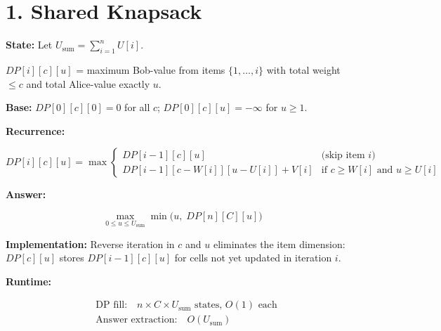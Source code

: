 \documentclass[11pt]{article}
\begin{document}
\section*{1. Shared Knapsack}

\textbf{State:}
Let $U_{\mathrm{sum}} = \sum_{i=1}^{n} U[i]$.

$DP[i][c][u]$ = maximum Bob-value from items $\{1, \ldots, i\}$
with total weight $\le c$ and total Alice-value exactly $u$.

\textbf{Base:}
$DP[0][c][0] = 0$ for all $c$; \quad $DP[0][c][u] = -\infty$ for $u \ge 1$.

\textbf{Recurrence:}

\[
DP[i][c][u] = \max\!\begin{cases}
DP[i{-}1][c][u] & \text{(skip item } i\text{)} \\
DP[i{-}1][c{-}W[i]][u{-}U[i]] + V[i] & \text{if } c \ge W[i] \text{ and } u \ge U[i]
\end{cases}
\]

\textbf{Answer:}

\[
\max_{0 \le u \le U_{\mathrm{sum}}} \min\!\big(u,\; DP[n][C][u]\big)
\]

\textbf{Implementation:}
Reverse iteration in $c$ and $u$ eliminates the item dimension:
$DP[c][u]$ stores $DP[i{-}1][c][u]$ for cells not yet updated in iteration $i$.

\begin{algorithm}[H]
\DontPrintSemicolon
{}
\end{algorithm}

\textbf{Runtime:}

\begin{align*}
&\text{DP fill:} \quad n \times C \times U_{\mathrm{sum}} \text{ states, } O(1) \text{ each} \\
&\text{Answer extraction:} \quad O(U_{\mathrm{sum}})
\end{align*}
\end{document}
